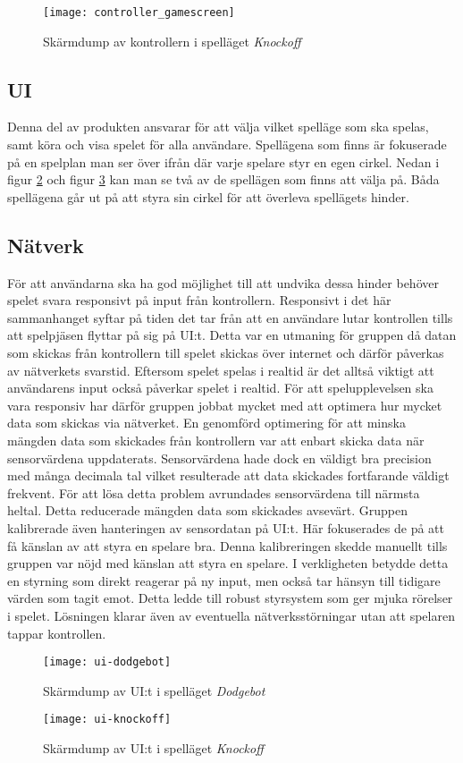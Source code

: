 \begin{figure}[h]
    \centering
    \texttt{[image: controller\_gamescreen]}
    \caption{Skärmdump av kontrollern i spelläget \textit{Knockoff}}
    \label{fig:controller_gamescreen}
\end{figure}

\subsection{UI}
Denna del av produkten ansvarar för att välja vilket spelläge som ska spelas, samt köra och visa spelet för alla användare. Spellägena som finns är fokuserade på en spelplan man ser över ifrån där varje spelare styr en egen cirkel. Nedan i figur \ref{fig:ui-dodgebot} och figur \ref{fig:ui-knockoff} kan man se två av de spellägen som finns att välja på. Båda spellägena går ut på att styra sin cirkel för att överleva spellägets hinder. 

\subsection{Nätverk}
För att användarna ska ha god möjlighet till att undvika dessa hinder behöver spelet svara responsivt på input från kontrollern. Responsivt i det här sammanhanget syftar på tiden det tar från att en användare lutar kontrollen tills att spelpjäsen flyttar på sig på UI:t. Detta var en utmaning för gruppen då datan som skickas från kontrollern till spelet skickas över internet och därför påverkas av nätverkets svarstid. Eftersom spelet spelas i realtid är det alltså viktigt att användarens input också påverkar spelet i realtid. För att spelupplevelsen ska vara responsiv har därför gruppen jobbat mycket med att optimera hur mycket data som skickas via nätverket. En genomförd optimering för att minska mängden data som skickades från kontrollern var att enbart skicka data när sensorvärdena uppdaterats. Sensorvärdena hade dock en väldigt bra precision med många decimala tal vilket resulterade att data skickades fortfarande väldigt frekvent. För att lösa detta problem avrundades sensorvärdena till närmsta heltal. Detta reducerade mängden data som skickades avsevärt. Gruppen kalibrerade även hanteringen av sensordatan på UI:t. Här fokuserades de på att få känslan av att styra en spelare bra. Denna kalibreringen skedde manuellt tills gruppen var nöjd med känslan att styra en spelare. I verkligheten betydde detta en styrning som direkt reagerar på ny input, men också tar hänsyn till tidigare värden som tagit emot. Detta ledde till robust styrsystem som ger mjuka rörelser i spelet. Lösningen klarar även av eventuella nätverksstörningar utan att spelaren tappar kontrollen. 

\begin{figure}[t]
    \centering
    \texttt{[image: ui-dodgebot]}
    \caption{Skärmdump av UI:t i spelläget \textit{Dodgebot}}
    \label{fig:ui-dodgebot}
\end{figure}

\begin{figure}[b]
    \centering
    \texttt{[image: ui-knockoff]}
    \caption{Skärmdump av UI:t i spelläget \textit{Knockoff}}
    \label{fig:ui-knockoff}
\end{figure}

